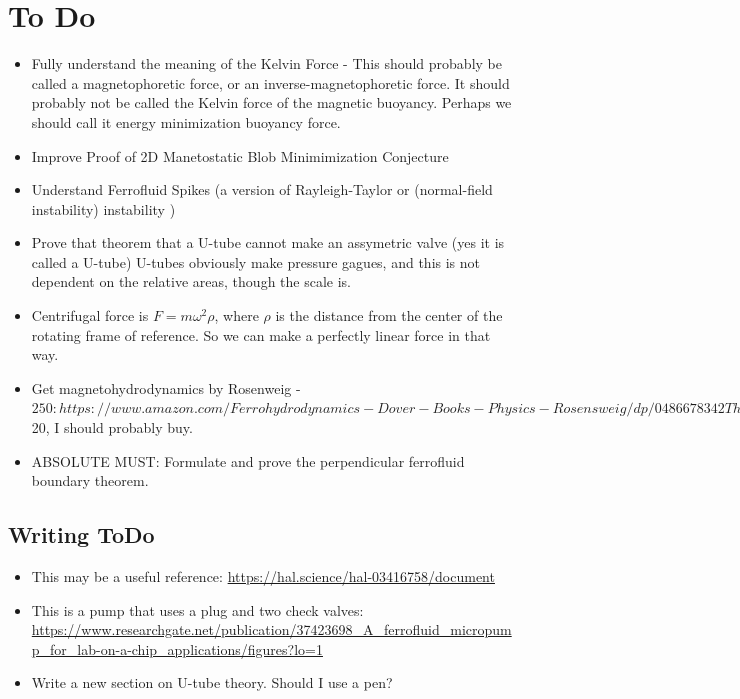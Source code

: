 \documentclass{asme2ej}
\begin{document}
\section{To Do}
\begin{itemize}
\item Fully understand the meaning of the Kelvin Force - This should probably be called a magnetophoretic force,
  or an inverse-magnetophoretic force. It should probably not be called the Kelvin force of the magnetic buoyancy.
  Perhaps we should call it energy minimization buoyancy force.
\item Improve Proof of 2D Manetostatic Blob Minimimization Conjecture
\item Understand Ferrofluid Spikes (a version of Rayleigh-Taylor or (normal-field instability) instability )
\item Prove that theorem that a U-tube cannot make an assymetric valve (yes it is called a U-tube)
  U-tubes obviously make pressure gagues, and this is not dependent on the relative areas,
  though the scale is.
\item Centrifugal force is $ F = m \omega^2 \rho$, where $\rho$ is the distance from the center of the rotating frame of
  reference. So we can make a perfectly linear force in that way.
\item Get magnetohydrodynamics by Rosenweig - $250: https://www.amazon.com/Ferrohydrodynamics-Dover-Books-Physics-Rosensweig/dp/0486678342 There is a Kindle Edition for $20, I should probably buy.
  \item ABSOLUTE MUST: Formulate and prove the perpendicular ferrofluid boundary theorem.
\end{itemize}

\subsection{Writing ToDo}

\begin{itemize}
\item This may be a useful reference: \url{https://hal.science/hal-03416758/document}
\item This is a pump that uses a plug and two check valves: \url{https://www.researchgate.net/publication/37423698_A_ferrofluid_micropump_for_lab-on-a-chip_applications/figures?lo=1}
  \item Write a new section on U-tube theory. Should I use a pen?
  \end{itemize}
\end{document}

